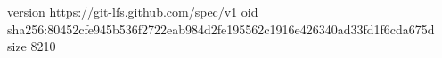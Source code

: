 version https://git-lfs.github.com/spec/v1
oid sha256:80452cfe945b536f2722eab984d2fe195562c1916e426340ad33fd1f6cda675d
size 8210
